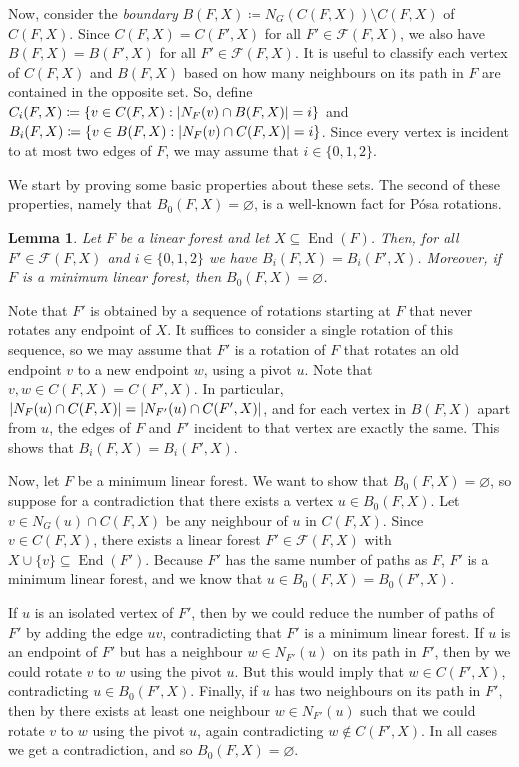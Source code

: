 \documentclass[11pt]{article}
\makeatletter
\theoremstyle{plain}
\newtheorem{lemma}[theorem]{Lemma}
\theoremstyle{definition}
\renewenvironment{proof}[1][\proofname]
{\par\pushQED{\qed}
	\normalfont\topsep6\p@\@plus6\p@\relax\trivlist
	\item[\hskip\labelsep\bfseries#1\@addpunct{.}]
	\ignorespaces}
{\popQED\endtrivlist\@endpefalse}
\let\emptyset\varnothing
\newcommand{\cF}{\mathcal F}
\DeclarePairedDelimiter{\abs}{\lvert}{\rvert}
\DeclareMathOperator{\End}{End}
\makeatother
\begin{document}
Now, consider the \emph{boundary} $B(F,X) \coloneqq N_G(C(F,X)) \setminus C(F,X)$ of $C(F,X)$. Since $C(F,X) = C(F',X)$ for all $F' \in \cF(F,X)$, we also have $B(F,X) = B(F',X)$ for all $F' \in \cF(F,X)$. It is useful to classify each vertex of $C(F,X)$ and $B(F,X)$ based on how many neighbours on its path in $F$ are contained in the opposite set. So, define $C_i(F,X) \coloneqq \{v \in C(F,X) : \abs{N_F(v) \cap B(F,X)} = i\}$ and $B_i(F,X) \coloneqq \{v \in B(F,X) : \abs{N_F(v) \cap C(F,X)} = i\}$. Since every vertex is incident to at most two edges of $F$, we may assume that $i \in \{0, 1, 2\}$.

We start by proving some basic properties about these sets. The second of these properties, namely that $B_0(F,X) = \emptyset$, is a well-known fact for P\'{o}sa rotations.

\begin{lemma}\label{lem:b0empty}
    Let $F$ be a linear forest and let $X \subseteq \End(F)$. Then, for all $F' \in \cF(F,X)$ and $i \in \{0, 1, 2\}$ we have $B_i(F,X) = B_i(F',X)$. Moreover, if $F$ is a minimum linear forest, then $B_0(F,X) = \emptyset$.
\end{lemma}

\begin{proof}
    Note that $F'$ is obtained by a sequence of rotations starting at $F$ that never rotates any endpoint of $X$. It suffices to consider a single rotation of this sequence, so we may assume that $F'$ is a rotation of $F$ that rotates an old endpoint $v$ to a new endpoint $w$, using a pivot $u$. Note that $v, w \in C(F,X) = C(F',X)$. In particular, $\abs{N_F(u) \cap C(F,X)} = \abs{N_{F'}(u) \cap C(F',X)}$, and for each vertex in $B(F,X)$ apart from $u$, the edges of $F$ and $F'$ incident to that vertex are exactly the same. This shows that $B_i(F,X) = B_i(F',X)$.

    Now, let $F$ be a minimum linear forest. We want to show that $B_0(F,X) = \emptyset$, so suppose for a contradiction that there exists a vertex $u \in B_0(F,X)$. Let $v \in N_G(u) \cap C(F,X)$ be any neighbour of $u$ in $C(F,X)$. Since $v \in C(F,X)$, there exists a linear forest $F' \in \cF(F,X)$ with $X \cup \{v\} \subseteq \End(F')$. Because $F'$ has the same number of paths as $F$, $F'$ is a minimum linear forest, and we know that $u \in B_0(F,X) = B_0(F',X)$.

    If $u$ is an isolated vertex of $F'$, then by  we could reduce the number of paths of $F'$ by adding the edge $u v$, contradicting that $F'$ is a minimum linear forest. If $u$ is an endpoint of $F'$ but has a neighbour $w \in N_{F'}(u)$ on its path in $F'$, then by  we could rotate $v$ to $w$ using the pivot $u$. But this would imply that $w \in C(F',X)$, contradicting $u \in B_0(F',X)$. Finally, if $u$ has two neighbours on its path in $F'$, then by  there exists at least one neighbour $w \in N_{F'}(u)$ such that we could rotate $v$ to $w$ using the pivot $u$, again contradicting $w \notin C(F',X)$. In all cases we get a contradiction, and so $B_0(F,X) = \emptyset$.
\end{proof}
\end{document}
